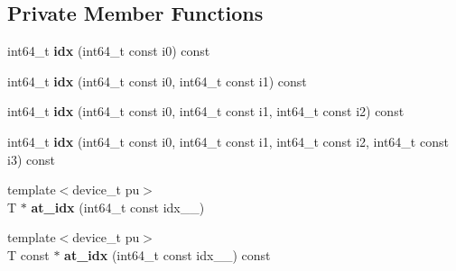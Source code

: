 \subsection*{Private Member Functions}
\begin{DoxyCompactItemize}
\item 
\hypertarget{classsddk_1_1mdarray__base_aa8e8c0f5dd249d763ff54f7f27df255e}{}int64\+\_\+t {\bfseries idx} (int64\+\_\+t const i0) const \label{classsddk_1_1mdarray__base_aa8e8c0f5dd249d763ff54f7f27df255e}

\item 
\hypertarget{classsddk_1_1mdarray__base_a915a95b314232342efae65ea50f8814f}{}int64\+\_\+t {\bfseries idx} (int64\+\_\+t const i0, int64\+\_\+t const i1) const \label{classsddk_1_1mdarray__base_a915a95b314232342efae65ea50f8814f}

\item 
\hypertarget{classsddk_1_1mdarray__base_ae1acade30618e36ddef828476cf34da1}{}int64\+\_\+t {\bfseries idx} (int64\+\_\+t const i0, int64\+\_\+t const i1, int64\+\_\+t const i2) const \label{classsddk_1_1mdarray__base_ae1acade30618e36ddef828476cf34da1}

\item 
\hypertarget{classsddk_1_1mdarray__base_aa964303f70a2e435711c6ea0909ddeac}{}int64\+\_\+t {\bfseries idx} (int64\+\_\+t const i0, int64\+\_\+t const i1, int64\+\_\+t const i2, int64\+\_\+t const i3) const \label{classsddk_1_1mdarray__base_aa964303f70a2e435711c6ea0909ddeac}

\item 
\hypertarget{classsddk_1_1mdarray__base_a13827623edc9c69cd8d0ee66705c5dd5}{}{\footnotesize template$<$device\+\_\+t pu$>$ }\\T $\ast$ {\bfseries at\+\_\+idx} (int64\+\_\+t const idx\+\_\+\+\_\+)\label{classsddk_1_1mdarray__base_a13827623edc9c69cd8d0ee66705c5dd5}

\item 
\hypertarget{classsddk_1_1mdarray__base_adc186538650dc6bace5d7daed5ac37e9}{}{\footnotesize template$<$device\+\_\+t pu$>$ }\\T const $\ast$ {\bfseries at\+\_\+idx} (int64\+\_\+t const idx\+\_\+\+\_\+) const \label{classsddk_1_1mdarray__base_adc186538650dc6bace5d7daed5ac37e9}


\end{DoxyCompactItemize}
